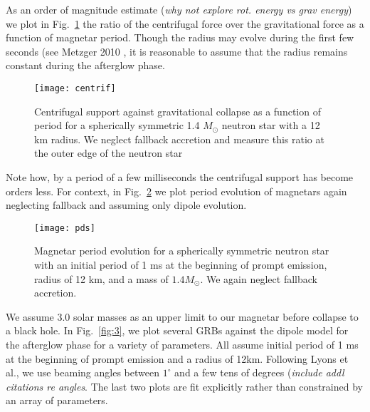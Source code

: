 \documentclass{article}
\begin{document}
As an order of magnitude estimate (\textit{why not explore rot. energy vs grav energy}) we plot in Fig.~\ref{fig:1} the ratio of the centrifugal force over the gravitational force as a function of magnetar period. Though the radius may evolve during the first few seconds (see Metzger 2010 \cite{Metzger:2010pp}, it is reasonable to assume that the radius remains constant during the afterglow phase.

\begin{figure}[h!]
\centering
\texttt{[image: centrif]}
\caption{Centrifugal support against gravitational collapse as a function of period for a spherically symmetric 1.4 $M_{\odot}$ neutron star with a 12 km radius. We neglect fallback accretion and measure this ratio at the outer edge of the neutron star}
\label{fig:1}
\end{figure}

Note how, by a period of a few milliseconds the centrifugal support has become orders less. For context, in Fig.~\ref{fig:2} we plot period evolution of magnetars again neglecting fallback and assuming only dipole evolution.

\begin{figure}[h!]
\centering
\texttt{[image: pds]}
\caption{Magnetar period evolution for a spherically symmetric neutron star with an initial period of 1 ms at the beginning of prompt emission, radius of 12 km, and a mass of $1.4 M_{\odot}$. We again neglect fallback accretion.}
\label{fig:2}
\end{figure}

We assume 3.0 solar masses \cite{Kaplan:2013wra} as an upper limit to our magnetar before collapse to a black hole. In Fig.~\ref{fig:3}, we plot several GRBs against the dipole model for the afterglow phase for a variety of parameters. All assume initial period of 1 ms at the beginning of prompt emission and a radius of 12km. Following Lyons et al., we use beaming angles between $1^{\circ}$ and a few tens of degrees \cite{Lyons:2009ka} (\textit{include addl citations re angles}.  The last two plots are fit explicitly rather than constrained by an array of parameters.
\end{document}

